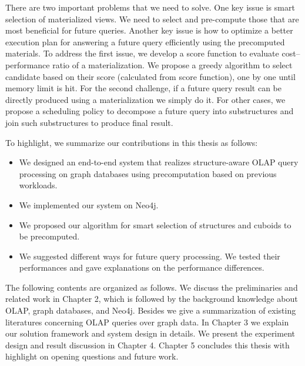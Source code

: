 
There are two important problems that we need to solve. One key issue is smart selection of materialized views. We need to select and pre-compute those that are most beneficial for future queries. Another key issue is how to optimize a better execution plan for answering a future query efficiently using the precomputed materials.
To address the first issue, we develop a score function to evaluate cost–performance ratio of a materialization. We propose a greedy algorithm to  select candidate  based on their score (calculated from score function), one by one until memory limit is hit. For the second challenge, if a future query result can be directly produced using a materialization we simply do it. For other cases, we propose a scheduling policy to decompose a future query into substructures and join such substructures to produce final result.

To highlight, we summarize our contributions in this thesis as follows:
\begin{itemize}
	\item {We designed an end-to-end system that realizes structure-aware OLAP query processing on graph databases using precomputation based on previous workloads.}
	
	\item We implemented our system on Neo4j.
	
	\item We proposed our algorithm for smart selection of structures and cuboids to be precomputed.
	
	\item We suggested different ways for future query processing. We tested their performances and gave explanations on the performance differences.
	
\end{itemize}

The following contents are organized as follows.
We discuss the preliminaries and related work in Chapter 2, which is followed by the background knowledge about  OLAP, graph databases, and Neo4j. Besides we give a summarization of existing literatures concerning OLAP queries over graph data. In Chapter 3 we explain our solution framework and system design in details. We present the experiment design and result discussion in Chapter 4. Chapter 5 concludes this thesis with highlight on opening questions and future work.

